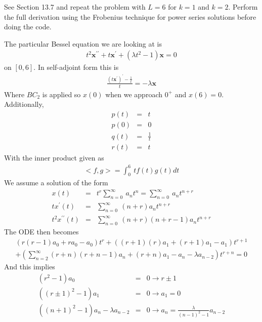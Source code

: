 \documentclass[11pt]{SelfArxOneColBMN}
\begin{document}
\begin{exercise}
  See Section 13.7 and repeat the problem with $L =6$ for $k = 1$ and $k = 2$. Perform the full derivation using the Frobenius technique for power series solutions before doing the code. 
  \begin{solution}
    The particular Bessel equation we are looking at is
    \begin{eqnarray*}
      t^2\mathbf{x}^{\prime\prime} + t\mathbf{x}^\prime + (\lambda t^2 - 1)\mathbf{x} = 0
    \end{eqnarray*}
    on $[0,6]$. In self-adjoint form this is
    \begin{eqnarray*}
      \frac{(t\mathbf{x}^\prime)^\prime - \frac{1}{t}}{t} = -\lambda\mathbf{x}
    \end{eqnarray*}
    Where $BC_2$ is applied so $x(0)$ when we approach $0^+$ and $x(6) = 0$. Additionally,
    \begin{eqnarray*}
      p(t) &=& t\\
      p(0) &=& 0\\
      q(t) &=& \frac{1}{t}\\
      r(t) &=& t
    \end{eqnarray*}
    With the inner product given as
    \begin{eqnarray*}
      <f,g> = \int_0^6\:tf(t)g(t)dt
    \end{eqnarray*}
    We assume a solution of the form
    \begin{eqnarray*}
      x(t) &=& t^r\sum_{n=0}^\infty\:a_nt^n = \sum_{n=0}^\infty\:a_nt^{n + r}\\
      tx^\prime(t) &=& \sum_{n=0}^\infty\:(n + r)a_nt^{n + r}\\
      t^2x^{\prime\prime}(t) &=& \sum_{n=0}^\infty\:(n + r)(n + r - 1)a_nt^{n + r}
    \end{eqnarray*}
    The ODE then becomes
    \begin{eqnarray*}
      (r(r - 1)a_0 + ra_0 - a_0)t^r + ((r + 1)(r)a_1 + (r + 1)a_1 - a_1)t^{r + 1}\\
       + (\sum_{n = 2}^\infty(r + n)(r + n - 1)a_n + (r + n)a_1 - a_n - \lambda a_{n - 2})t^{r + n} = 0
    \end{eqnarray*}
    And this implies
    \begin{eqnarray*}
      (r^2 - 1)a_0 &=& 0 \rightarrow r \pm 1\\
      ((r \pm 1)^2 - 1)a_1 &=& 0 \rightarrow a_1 = 0\\
      ((n + 1)^2 - 1)a_n - \lambda a_{n-2} &=& 0 \rightarrow a_n = \frac{\lambda}{(n - 1)^2 - 1}a_{n - 2}

\end{eqnarray*}
\end{solution}
\end{exercise}
\end{document}

